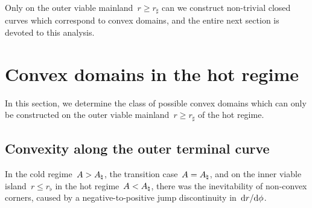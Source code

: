 Only on the outer viable mainland~$r \ge r_\sharp$
can we construct non-trivial closed curves
which correspond to convex domains,
and the entire next section is devoted to this analysis.

\section{Convex domains in the hot regime}
\label{sec:polar.convex}

In this section,
we determine the class of possible convex domains
which can only be constructed
on the outer viable mainland~$r \ge r_\sharp$
of the hot regime.

\subsection{Convexity along the outer terminal curve}
\label{sec:polar.convex.terminal}

In the cold regime~$A > A_\natural$, the transition case~$A = A_\natural$,
and on the inner viable island~$r \le r_\flat$
in the hot regime~$A < A_\natural$,
there was the inevitability of non-convex corners,
caused by a negative-to-positive jump discontinuity in~$\mathop{}\!\mathrm{d} r / {\mathop{}\!\mathrm{d}\phi}$.

